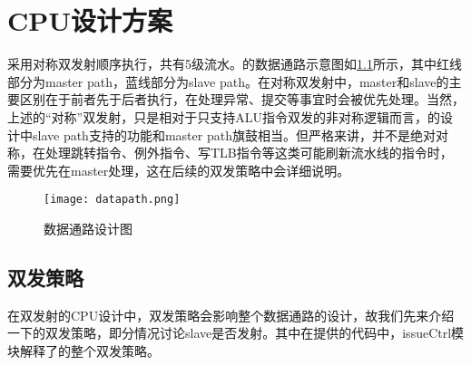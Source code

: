 \chapter{CPU设计方案}

\cpuname 采用对称双发射顺序执行，共有5级流水。\cpuname 的数据通路示意图如\ref{img:datapath}所示，其中红线部分为master path，蓝线部分为slave path。在对称双发射中，master和slave的主要区别在于前者先于后者执行，在处理异常、提交等事宜时会被优先处理。当然，上述的“对称”双发射，只是相对于只支持ALU指令双发的非对称逻辑而言，\cpuname 的设计中slave path支持的功能和master path旗鼓相当。但严格来讲，并不是绝对对称，在处理跳转指令、例外指令、写TLB指令等这类可能刷新流水线的指令时，需要优先在master处理，这在后续的双发策略中会详细说明。

\begin{figure}[h]
	\centering
	\texttt{[image: datapath.png]}
	\caption{数据通路设计图}
	\label{img:datapath}
\end{figure}


\section{双发策略}
在双发射的CPU设计中，双发策略会影响整个数据通路的设计，故我们先来介绍一下\cpuname 的双发策略，即分情况讨论slave是否发射。其中在提供的代码中，issueCtrl模块解释了\cpuname 的整个双发策略。

